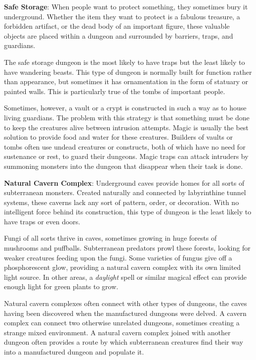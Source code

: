 \textbf{Safe Storage}: When people want to protect something, they sometimes bury it underground. Whether the item they want to protect is a fabulous treasure, a forbidden artifact, or the dead body of an important figure, these valuable objects are placed within a dungeon and surrounded by barriers, traps, and guardians.
				
The safe storage dungeon is the most likely to have traps but the least likely to have wandering beasts. This type of dungeon is normally built for function rather than appearance, but sometimes it has ornamentation in the form of statuary or painted walls. This is particularly true of the tombs of important people.
				
Sometimes, however, a vault or a crypt is constructed in such a way as to house living guardians. The problem with this strategy is that something must be done to keep the creatures alive between intrusion attempts. Magic is usually the best solution to provide food and water for these creatures. Builders of vaults or tombs often use undead creatures or constructs, both of which have no need for sustenance or rest, to guard their dungeons. Magic traps can attack intruders by summoning monsters into the dungeon that disappear when their task is done.
				
\textbf{Natural Cavern Complex}: Underground caves provide homes for all sorts of subterranean monsters. Created naturally and connected by labyrinthine tunnel systems, these caverns lack any sort of pattern, order, or decoration. With no intelligent force behind its construction, this type of dungeon is the least likely to have traps or even doors.
				
Fungi of all sorts thrive in caves, sometimes growing in huge forests of mushrooms and puffballs. Subterranean predators prowl these forests, looking for weaker creatures feeding upon the fungi. Some varieties of fungus give off a phosphorescent glow, providing a natural cavern complex with its own limited light source. In other areas, a \textit{daylight }spell or similar magical effect can provide enough light for green plants to grow.
				
Natural cavern complexes often connect with other types of dungeons, the caves having been discovered when the manufactured dungeons were delved. A cavern complex can connect two otherwise unrelated dungeons, sometimes creating a strange mixed environment. A natural cavern complex joined with another dungeon often provides a route by which subterranean creatures find their way into a manufactured dungeon and populate it.
				
